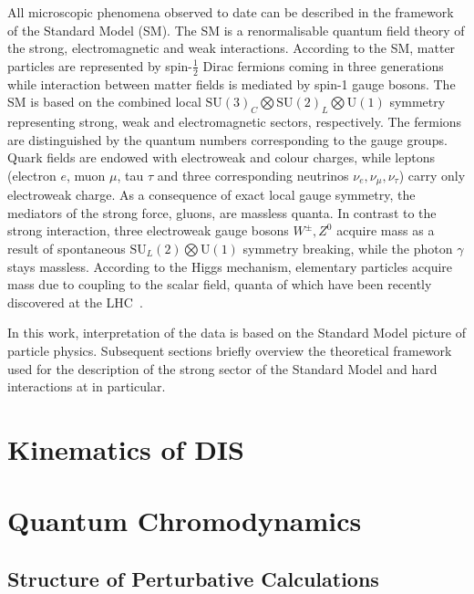 All microscopic phenomena observed to date can be described in the framework of the Standard Model (SM). The SM is a renormalisable quantum field theory of the strong, electromagnetic and weak interactions. According to the SM, matter particles are represented by spin-$\frac{1}{2}$ Dirac fermions coming in three generations while interaction between matter fields is mediated by spin-1 gauge bosons. The SM is based on the combined local $\mathrm{SU}\left(3\right)_{C} \bigotimes \mathrm{SU}\left(2\right)_{L} \bigotimes \mathrm{U}\left(1\right)$ symmetry representing strong, weak and electromagnetic sectors, respectively. The fermions are distinguished by the quantum numbers corresponding to the gauge groups. Quark fields are endowed with electroweak and colour charges, while leptons (electron $e$, muon $\mu$, tau $\tau$ and three corresponding neutrinos $\nu_e, \nu_\mu, \nu_\tau$) carry only electroweak charge. As a consequence of exact local gauge symmetry, the mediators of the strong force, gluons, are massless quanta. In contrast to the strong interaction, three electroweak gauge bosons $W^\pm, Z^0$ acquire mass as a result of spontaneous $\mathrm{SU}_{L}\left(2\right) \bigotimes \mathrm{U}\left(1\right)$ symmetry breaking, while the photon $\gamma$ stays massless. According to the Higgs mechanism, elementary particles acquire mass due to coupling to the scalar field, quanta of which have been recently discovered at the LHC~\cite{pl:b716:1,pl:b716:30}.

In this work, interpretation of the data is based on the Standard Model picture of particle physics. Subsequent sections briefly overview the theoretical framework used for the description of the strong sector of the Standard Model and hard interactions at \hera in particular.

\section{Kinematics of DIS}
\label{sec:kindis}


\section{Quantum Chromodynamics}
\label{sec:qcd}


\subsection{Structure of Perturbative Calculations}
\label{subsec:pqcdstructure}


